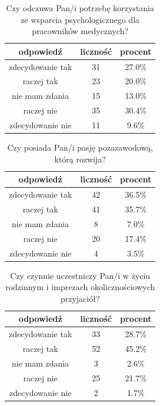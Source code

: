 \documentclass[a4paper,12pt,twoside,openany]{report}
\begin{document}
\begin{table}[h]
\caption{Czy odczuwa Pan/i potrzebę korzystania ze wsparcia psychologicznego dla pracowników medycznych?}
\centering
\begin{tabular}{ | c | c | c |}
\hline
odpowiedź & liczność & procent\\
\hline
zdecydowanie tak  &  31  & 27.0\% \\
\hline
raczej tak  &  23  & 20.0\% \\
\hline
nie mam zdania  &  15  & 13.0\% \\
\hline
raczej nie  &  35  & 30.4\% \\
\hline
zdecydowanie nie  &  11  & 9.6\% \\
\hline
\end{tabular}
\label{tab:Q22}
\end{table}



\begin{table}[h]
\caption{Czy posiada Pan/i pasję pozazawodową, którą rozwija?}
\centering
\begin{tabular}{ | c | c | c |}
\hline
odpowiedź & liczność & procent\\
\hline
zdecydowanie tak  &  42  & 36.5\% \\
\hline
raczej tak  &  41  & 35.7\% \\
\hline
nie mam zdania  &  8  & 7.0\% \\
\hline
raczej nie  &  20  & 17.4\% \\
\hline
zdecydowanie nie  &  4  & 3.5\% \\
\hline
\end{tabular}
\label{tab:Q23}
\end{table}



\begin{table}[h]
\caption{Czy czynnie uczestniczy Pan/i w życiu rodzinnym i imprezach okolicznościowych przyjaciół?}
\centering
\begin{tabular}{ | c | c | c |}
\hline
odpowiedź & liczność & procent\\
\hline
zdecydowanie tak  &  33  & 28.7\% \\
\hline
raczej tak  &  52  & 45.2\% \\
\hline
nie mam zdania  &  3  & 2.6\% \\
\hline
raczej nie  &  25  & 21.7\% \\
\hline
zdecydowanie nie  &  2  & 1.7\% \\
\hline
\end{tabular}
\label{tab:Q24}
\end{table}
\end{document}
